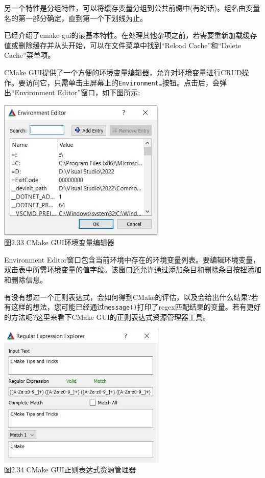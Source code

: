 \begin{tcolorbox}[colback=webgreen!5!white,colframe=webgreen!75!black,title=Tip]
另一个特性是分组特性，可以将缓存变量分组到公共前缀中(有的话)。组名由变量名的第一部分确定，直到第一个下划线为止。
\end{tcolorbox}

已经介绍了cmake-gui的最基本特性。在处理其他杂项之前，若需要重新加载缓存值或删除缓存并从头开始，可以在文件菜单中找到“Reload Cache”和“Delete Cache”菜单项。


CMake GUI提供了一个方便的环境变量编辑器，允许对环境变量进行CRUD操作。要访问它，只需单击主屏幕上的\texttt{Environment…}按钮。点击后，会弹出“Environment Editor”窗口，如下图所示:

\begin{center}
\includegraphics[width=0.6\textwidth]{content/1/chapter2/images/33.jpg}\\
图2.33  CMake GUI环境变量编辑器
\end{center}

Environment Editor窗口包含当前环境中存在的环境变量列表。要编辑环境变量，双击表中所需环境变量的值字段。该窗口还允许通过添加条目和删除条目按钮添加和删除信息。


有没有想过一个正则表达式，会如何得到CMake的评估，以及会给出什么结果?若有这样的想法，您可能已经通过\texttt{message()}打印了regex匹配结果的变量。若有更好的方法呢?这里来看下CMake GUI的正则表达式资源管理器工具。

\begin{center}
\includegraphics[width=0.6\textwidth]{content/1/chapter2/images/34.jpg}\\
图2.34  CMake GUI正则表达式资源管理器
\end{center}

